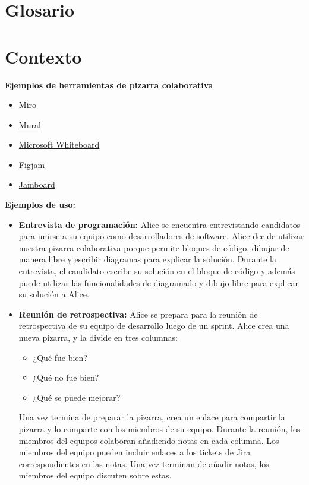 \documentclass[a4paper, oneside, final]{scrartcl}
\begin{document}
\section{Glosario}

\section{Contexto}

\textbf{Ejemplos de herramientas de pizarra colaborativa}

\begin{itemize}
\item \href{https://miro.com/}{Miro}
\item \href{https://www.mural.co/}{Mural}
\item \href{ https://www.microsoft.com/en-us/microsoft-365/microsoft-whiteboard/digital-whiteboard-app}{Microsoft Whiteboard}
\item \href{https://www.figma.com/figjam/}{Figjam}
\item \href{https://jamboard.google.com}{Jamboard}

\end{itemize}

\textbf{Ejemplos de uso:}

\begin{itemize}
\item \textbf{Entrevista de programación:} Alice se encuentra entrevistando candidatos para unirse a su equipo como
  desarrolladores de software. Alice decide utilizar nuestra pizarra colaborativa porque permite bloques de código,
  dibujar de manera libre y escribir diagramas para explicar la solución. Durante la entrevista, el candidato escribe
  su solución en el bloque de código y además puede utilizar las funcionalidades de diagramado y dibujo libre para explicar su solución a Alice.

\item \textbf{Reunión de retrospectiva:} Alice se prepara para la reunión de retrospectiva de su equipo de desarrollo luego de un sprint. Alice crea una nueva pizarra, y la divide en tres columnas:

  \begin{itemize}
  \item ¿Qué fue bien?
  \item ¿Qué no fue bien?
  \item ¿Qué se puede mejorar?
  \end{itemize}

  Una vez termina de preparar la pizarra, crea un enlace para compartir la pizarra y lo comparte con los miembros de su equipo. Durante la reunión, los miembros del equipos colaboran añadiendo notas en cada columna. Los miembros del equipo
  pueden incluir enlaces a los tickets de Jira correspondientes en las notas. Una vez terminan de añadir notas, los miembros del equipo discuten sobre estas.
\end{itemize}
\end{document}
